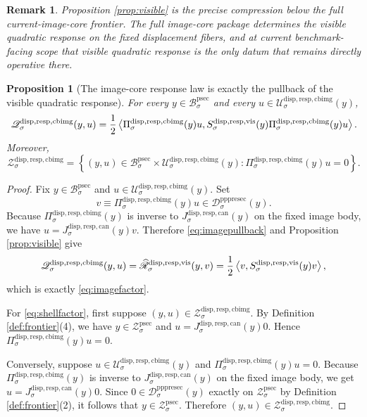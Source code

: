 \documentclass[11pt]{article}
\newcommand{\ProtoSectionBody}[1]{\mathcal B_{#1}^{\mathrm{psec}}}
\newcommand{\ProtoSectionShell}[1]{\mathcal Z_{#1}^{\mathrm{psec}}}
\newcommand{\PrePreProtoSectionResidualBody}[1]{\mathcal D_{#1}^{\mathrm{pppresec}}}
\newcommand{\ImageProjection}[1]{\Pi_{#1}^{\mathrm{disp,resp,cbimg}}}
\newcommand{\CanonicalLift}[1]{J_{#1}^{\mathrm{disp,resp,can}}}
\newcommand{\CanonicalImageBody}[1]{\mathcal U_{#1}^{\mathrm{disp,resp,cbimg}}}
\newcommand{\CanonicalImageResponseLaw}[1]{\mathscr Q_{#1}^{\mathrm{disp,resp,cbimg}}}
\newcommand{\CanonicalImageShell}[1]{\mathcal Z_{#1}^{\mathrm{disp,resp,cbimg}}}
\newcommand{\CoreForcedBodyResponse}[1]{\widehat{\mathscr R}_{#1}^{\mathrm{disp,resp,vis}}}
\newcommand{\VisibleResponseOperator}[1]{S_{#1}^{\mathrm{disp,resp,vis}}}
\newtheorem{proposition}{Proposition}
\newtheorem{remark}{Remark}
\begin{document}
\begin{remark}
Proposition \ref{prop:visible} is the precise compression below the full current-image-core frontier. The full image-core package determines the visible quadratic response on the fixed displacement fibers, and at current benchmark-facing scope that visible quadratic response is the only datum that remains directly operative there.
\end{remark}

\begin{proposition}[The image-core response law is exactly the pullback of the visible quadratic response]
\label{prop:factor}
For every \(y\in\ProtoSectionBody{\sigma}\) and every \(u\in\CanonicalImageBody{\sigma}(y)\),
\begin{equation}
\CanonicalImageResponseLaw{\sigma}(y,u)
=
\frac{1}{2}
\ev{
\ImageProjection{\sigma}(y)u,
\VisibleResponseOperator{\sigma}(y)\ImageProjection{\sigma}(y)u
}.
\label{eq:imagefactor}
\end{equation}
Moreover,
\begin{equation}
\CanonicalImageShell{\sigma}
=
\left\{
(y,u)\in\ProtoSectionBody{\sigma}\times\CanonicalImageBody{\sigma}(y):
\ImageProjection{\sigma}(y)u=0
\right\}.
\label{eq:shellfactor}
\end{equation}
\end{proposition}

\begin{proof}
Fix \(y\in\ProtoSectionBody{\sigma}\) and \(u\in\CanonicalImageBody{\sigma}(y)\). Set
\[
v\equiv \ImageProjection{\sigma}(y)u
\in
\PrePreProtoSectionResidualBody{\sigma}(y).
\]
Because \(\ImageProjection{\sigma}(y)\) is inverse to \(\CanonicalLift{\sigma}(y)\) on the fixed image body, we have \(u=\CanonicalLift{\sigma}(y)v\). Therefore \eqref{eq:imagepullback} and Proposition \ref{prop:visible} give
\[
\CanonicalImageResponseLaw{\sigma}(y,u)
=
\CoreForcedBodyResponse{\sigma}(y,v)
=
\frac{1}{2}
\ev{v,\VisibleResponseOperator{\sigma}(y)v},
\]
which is exactly \eqref{eq:imagefactor}.

For \eqref{eq:shellfactor}, first suppose \((y,u)\in\CanonicalImageShell{\sigma}\). By Definition \ref{def:frontier}(4), we have \(y\in\ProtoSectionShell{\sigma}\) and \(u=\CanonicalLift{\sigma}(y)0\). Hence \(\ImageProjection{\sigma}(y)u=0\).

Conversely, suppose \(u\in\CanonicalImageBody{\sigma}(y)\) and \(\ImageProjection{\sigma}(y)u=0\). Because \(\ImageProjection{\sigma}(y)\) is inverse to \(\CanonicalLift{\sigma}(y)\) on the fixed image body, we get \(u=\CanonicalLift{\sigma}(y)0\). Since \(0\in\PrePreProtoSectionResidualBody{\sigma}(y)\) exactly on \(\ProtoSectionShell{\sigma}\) by Definition \ref{def:frontier}(2), it follows that \(y\in\ProtoSectionShell{\sigma}\). Therefore \((y,u)\in\CanonicalImageShell{\sigma}\).
\end{proof}
\end{document}
